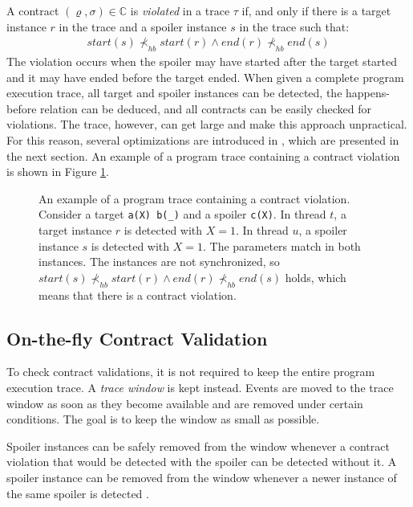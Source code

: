 A contract $(\varrho,\sigma) \in \mathbb{C}$ is \emph{violated} in a trace
$\tau$ if, and only if there is a target instance $r$ in the trace and a spoiler
instance $s$ in the trace such that:
\begin{align*}
    start(s) \nprec_{hb} start(r) \wedge end(r) \nprec_{hb} end(s)
\end{align*}
The violation occurs when the spoiler may have started after the target started
and it may have ended before the target ended. When given a complete program
execution trace, all target and spoiler instances can be detected, the
happens-before relation can be deduced, and all contracts can be easily checked
for violations. The trace, however, can get large and make this approach
unpractical. For this reason, several optimizations are introduced in
\cite{contracts}, which are presented in the next section. An example of a
program trace containing a contract violation is shown in Figure \ref{traces}.

\begin{figure}[hbt]
    \begin{center}
        \label{traces}
        
        \caption{An example of a program trace containing a contract violation.
        Consider a target \texttt{a(X) b(\_)} and a spoiler \texttt{c(X)}. In
        thread $t$, a target instance $r$ is detected with $X=1$. In thread $u$,
        a spoiler instance $s$ is detected with $X=1$. The parameters match in
        both instances. The instances are not synchronized, so $start(s)
        \nprec_{hb} start(r) \wedge end(r) \nprec_{hb} end(s)$ holds, which
        means that there is a contract violation.}
    \end{center}
\end{figure}

\subsection{On-the-fly Contract Validation}

To check contract validations, it is not required to keep the entire program
execution trace. A \emph{trace window} is kept instead. Events are moved to the
trace window as soon as they become available and are removed under certain
conditions. The goal is to keep the window as small as possible.

Spoiler instances can be safely removed from the window whenever a contract
violation that would be detected with the spoiler can be detected without it. A
spoiler instance can be removed from the window whenever a newer instance of the
same spoiler is detected \cite{contracts}.

